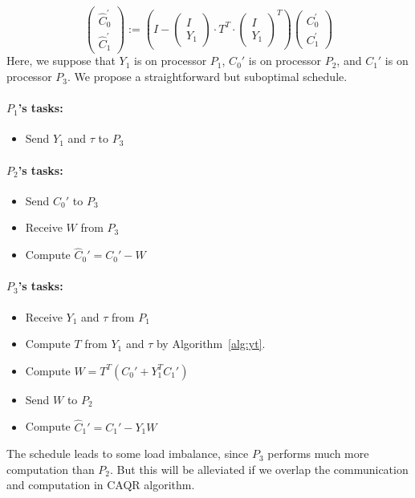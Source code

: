 \documentclass{article}
\begin{document}
\begin{equation}\left(\begin{array}{l}
\hat{C}_{0}^{\prime} \\
\hat{C}_{1}^{\prime}
\end{array}\right):=\left(I-\left(\begin{array}{c}
I \\
Y_{1}
\end{array}\right) \cdot {T^{T}} \cdot\left(\begin{array}{c}
I \\
Y_{1}
\end{array}\right)^{T}\right)\left(\begin{array}{c}
C_{0}^{\prime} \\
C_{1}^{\prime}
\end{array}\right)\end{equation}
Here, we suppose that $Y_1$ is on processor $P_1$, $C_0'$ is on processor $P_2$, and $C_1' $ is on processor $P_3$. We propose a straightforward but suboptimal schedule. 
\paragraph{$P_1$'s tasks:}
\begin{itemize}
	\item Send $Y_1$ and $\tau$ to $P_3$
\end{itemize}

\paragraph{$P_2$'s tasks:}
\begin{itemize}
	\item Send $C_0'$ to $P_3$
	\item Receive $W$ from $P_3$
	\item Compute $\hat C_0' = C_0' - W$
\end{itemize}

\paragraph{$P_3$'s tasks:}
\begin{itemize}
	\item Receive $Y_1$ and $\tau$ from $P_1$
	\item Compute $T$ from $Y_1$ and $\tau$ by Algorithm~\ref{alg:yt}. 
	\item Compute $W = T^T(C_0' + Y_1^TC_1')$
	\item Send $W$ to $P_2$ 
	\item Compute $\hat C_1' =C_1' - Y_1W$
\end{itemize}
The schedule leads to some load imbalance, since $P_3$ performs much more computation than $P_2$. But this will be alleviated if we overlap the communication and computation in  CAQR algorithm. 
\end{document}
